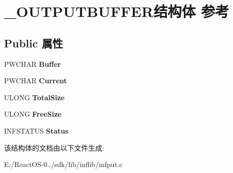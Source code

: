 \hypertarget{struct___o_u_t_p_u_t_b_u_f_f_e_r}{}\section{\+\_\+\+O\+U\+T\+P\+U\+T\+B\+U\+F\+F\+E\+R结构体 参考}
\label{struct___o_u_t_p_u_t_b_u_f_f_e_r}
\subsection*{Public 属性}
\begin{DoxyCompactItemize}
\item 
\mbox{\label{struct___o_u_t_p_u_t_b_u_f_f_e_r_a672691877138037573ca2034c8369b79}} 
P\+W\+C\+H\+AR {\bfseries Buffer}
\item 
\mbox{\label{struct___o_u_t_p_u_t_b_u_f_f_e_r_a8cfe38b6384b9b19ac100219f88cb27d}} 
P\+W\+C\+H\+AR {\bfseries Current}
\item 
\mbox{\label{struct___o_u_t_p_u_t_b_u_f_f_e_r_abadd05ed2a1d0326f0f8d8f0982a0e2c}} 
U\+L\+O\+NG {\bfseries Total\+Size}
\item 
\mbox{\label{struct___o_u_t_p_u_t_b_u_f_f_e_r_ac6073913832008028b09eda6c5086588}} 
U\+L\+O\+NG {\bfseries Free\+Size}
\item 
\mbox{\label{struct___o_u_t_p_u_t_b_u_f_f_e_r_a953055348136b4b8cb936ccfeb3a6bdc}} 
I\+N\+F\+S\+T\+A\+T\+US {\bfseries Status}
\end{DoxyCompactItemize}


该结构体的文档由以下文件生成\+:\begin{DoxyCompactItemize}
\item 
E\+:/\+React\+O\+S-\/0../sdk/lib/inflib/infput.\+c\end{DoxyCompactItemize}

